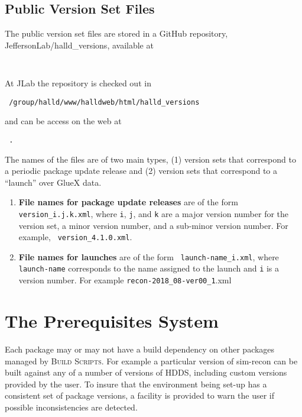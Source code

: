 \documentclass[12pt, letterpaper]{article}
\newcommand{\bs}{\textsc{Build Scripts}}
\begin{document}
\subsection{Public Version Set Files}

The public version set files are stored in a GitHub repository,
JeffersonLab/halld\_versions, available at

\begin{center} \tt
{}
\end{center}
At JLab the repository is checked out in
\begin{center} \tt
/group/halld/www/halldweb/html/halld\_versions
\end{center}
and can be access on the web at
\begin{center} \tt
{}.
\end{center}

The names of the files are of two main types, (1) version sets that
correspond to a periodic package update release and (2) version sets
that correspond to a ``launch'' over GlueX data.
\begin{enumerate}
\item {\bf File names for package update releases} are of the form
  {\tt version\_i.j.k.xml}, where {\tt i}, {\tt j}, and {\tt k} are a
  major version number for the version set, a minor version number,
  and a sub-minor version number. For example, {\tt
    version\_4.1.0.xml}.
\item {\bf File names for launches} are of the form {\tt
  launch-name\_i.xml}, where {\tt launch-name} corresponds to the name
  assigned to the launch and {\tt i} is a version number. For example
  {\tt recon-2018\_08-ver00\_1}.xml
\end{enumerate}

\section{The Prerequisites System}\label{section:prerequisites-system}

Each package may or may not have a build dependency on other packages
managed by \bs{}. For example a particular version of sim-recon can be
built against any of a number of versions of HDDS, including custom
versions provided by the user. To insure that the environment being
set-up has a consistent set of package versions, a facility is
provided to warn the user if possible inconsistencies are detected.
\end{document}
